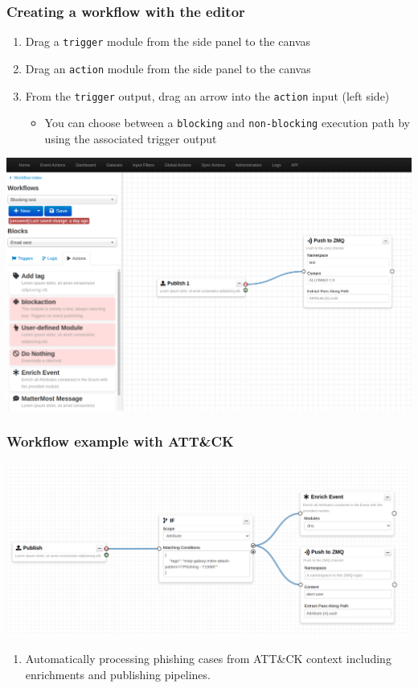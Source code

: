 \begin{frame}
    \frametitle{Creating a workflow with the editor}
    \begin{enumerate}
        \item Drag a \texttt{trigger} module from the side panel to the canvas
        \item Drag an \texttt{action} module from the side panel to the canvas
        \item From the \texttt{trigger} output, drag an arrow into the \texttt{action} input (left side)
        \begin{itemize}
            \item You can choose between a \texttt{blocking} and \texttt{non-blocking} execution path by using the associated trigger output
        \end{itemize}
    \end{enumerate}
    \begin{center}
        \includegraphics[width=1.0\linewidth]{pictures/editor-1.png}
    \end{center}
\end{frame}


\begin{frame}
    \frametitle{Workflow example with ATT\&CK}
    \begin{center}
        \includegraphics[width=0.9\linewidth]{pictures/ATT&CK-support.png}
    \end{center}

    \begin{enumerate}
        \item Automatically processing phishing cases from ATT\&CK context including enrichments and publishing pipelines. 
    \end{enumerate}
\end{frame}


